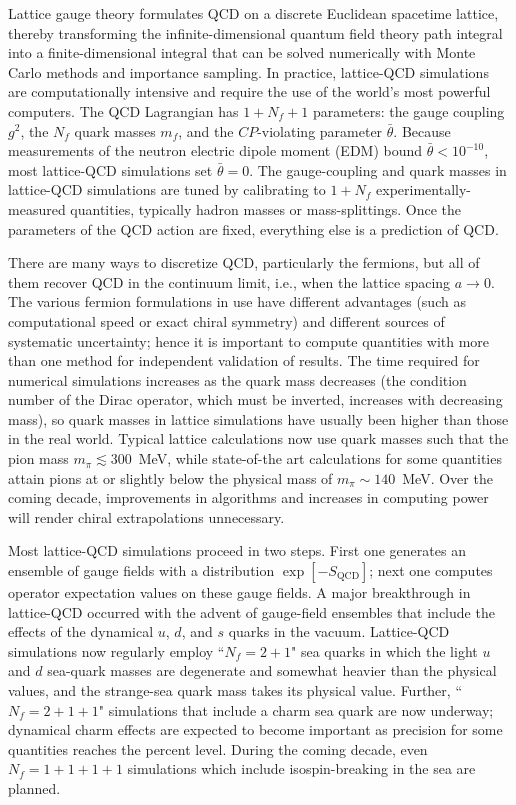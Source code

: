 Lattice gauge theory formulates QCD on a discrete Euclidean spacetime lattice, thereby transforming the
infinite-dimensional quantum field theory path integral into a finite-dimensional integral that can be solved
numerically with Monte Carlo methods and importance sampling.
In practice, lattice-QCD simulations are computationally intensive and require the use of the world's most
powerful computers.
The QCD Lagrangian has $1 + N_f + 1$ parameters: the gauge coupling $g^2$, the $N_f$ quark masses $m_f$, and 
the $CP$-violating parameter $\bar{\theta}$.
Because measurements of the neutron electric dipole moment (EDM) bound $\bar{\theta} < 10^{-10}$, most
lattice-QCD simulations set $\bar{\theta} = 0$.
The gauge-coupling and quark masses in lattice-QCD simulations are tuned by calibrating to $1 + N_f$
experimentally-measured quantities, typically hadron masses or mass-splittings.
Once the parameters of the QCD action are fixed, everything else is a prediction of QCD.

There are many ways to discretize QCD, particularly the fermions, but all of them recover QCD in the
continuum limit, i.e., when the lattice spacing $a\to 0$.
The various fermion formulations in use have different advantages (such as computational speed or exact
chiral symmetry) and different sources of systematic uncertainty; hence it is important to compute quantities
with more than one method for independent validation of results.
The time required for numerical simulations increases as the quark mass decreases (the condition number of
the Dirac operator, which must be inverted, increases with decreasing mass), so quark masses in lattice
simulations have usually been higher than those in the real world.
Typical lattice calculations now use quark masses such that the pion mass $m_\pi \lesssim 300$~MeV, while 
state-of-the art calculations for some quantities attain pions at or slightly below the physical mass of 
$m_\pi\sim140$~MeV. 
Over the coming decade, improvements in algorithms and increases in computing power will render chiral
extrapolations unnecessary.

Most lattice-QCD simulations proceed in two steps.
First one generates an ensemble of gauge fields with a distribution $\exp[-S_\text{QCD}]$; next one
computes operator expectation values on these gauge fields.
A major breakthrough in lattice-QCD occurred with the advent of gauge-field ensembles that include the
effects of the dynamical $u$, $d$, and $s$ quarks in the vacuum.
Lattice-QCD simulations now regularly employ ``$N_f = 2+1$" sea quarks in which the light $u$ and $d$
sea-quark masses are degenerate and somewhat heavier than the physical values, and the strange-sea quark mass
takes its physical value.
Further, ``$N_f = 2 + 1 + 1$" simulations that include a charm sea quark are now underway; dynamical charm
effects are expected to become important as precision for some quantities reaches the percent level.
During the coming decade, even $N_f=1+1+1+1$ simulations which include isospin-breaking in the sea are
planned.

